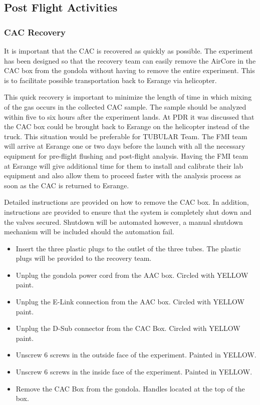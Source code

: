 \subsection{Post Flight Activities}

\subsubsection{CAC Recovery}
It is important that the CAC is recovered as quickly as possible. The experiment has been designed so that the recovery team can easily remove the AirCore in the CAC box from the gondola without having to remove the entire experiment. This is to facilitate possible transportation back to Esrange via helicopter.

This quick recovery is important to minimize the length of time in which mixing of the gas occurs in the collected CAC sample. The sample should be analyzed within five to six hours after the experiment lands. At PDR it was discussed that the CAC box could be brought back to Esrange on the helicopter instead of the truck. This situation would be preferable for TUBULAR Team. 
The FMI team will arrive at Esrange one or two days before the launch with all the necessary equipment for pre-flight flushing and post-flight analysis. Having the FMI team at Esrange will give additional time for them to install and calibrate their lab equipment and also allow them to proceed faster with the analysis process as soon as the CAC is returned to Esrange. 

Detailed instructions are provided on how to remove the CAC box. In addition, instructions are provided to ensure that the system is completely shut down and the valves secured. Shutdown will be automated however, a manual shutdown mechanism will be included should the automation fail.

\label{sec:recovery-checklist}

\begin{itemize}
    \item Insert the three plastic plugs to the outlet of the three tubes. The plastic plugs will be provided to the recovery team. 
    \item Unplug the gondola power cord from the AAC box. Circled with YELLOW paint.
    \item Unplug the E-Link connection from the AAC box. Circled with YELLOW paint.
    \item Unplug the D-Sub connector from the CAC Box. Circled with YELLOW paint.
    \item Unscrew 6 screws in the outside face of the experiment. Painted in YELLOW.
    \item Unscrew 6 screws in the inside face of the experiment. Painted in YELLOW.
    \item Remove the CAC Box from the gondola. Handles located at the top of the box. 
\end{itemize}

